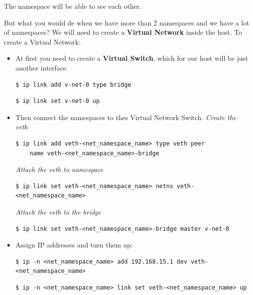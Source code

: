 \documentclass{article}
\newenvironment{codetemplate}[1][]{%
  \mybasecolorbox[#1]
  \itshape
}{%
  \endmybasecolorbox
}
\begin{document}
The namespace will be able to see each other.

But what you would de when we have more than 2 namespaces and we have a lot of namespaces? We will need to create a \textbf{Virtual Network} inside the host. To create a Virtual Network:
\begin{itemize}
    \item At first you need to create a \textbf{Virtual Switch}, which for our host will be just another interface.
\begin{codetemplate}{}
\begin{verbatim}
$ ip link add v-net-0 type bridge
\end{verbatim}
\end{codetemplate}
\begin{codetemplate}{}
\begin{verbatim}
$ ip link set v-net-0 up
\end{verbatim}
\end{codetemplate}
    \item Then connect the namespaces to thes Virtual Network Switch.
\begin{codetemplate}{Create the veth}
\begin{verbatim}
$ ip link add veth-<net_namespace_name> type veth peer 
    name veth-<net_namespace_name>-bridge
\end{verbatim}
\end{codetemplate}
\begin{codetemplate}{Attach the veth to namespace}
\begin{verbatim}
$ ip link set veth-<net_namespace_name> netns veth-<net_namespace_name>
\end{verbatim}
\end{codetemplate}
\begin{codetemplate}{Attach the veth to the bridge}
\begin{verbatim}
$ ip link set veth-<net_namespace_name>-bridge master v-net-0
\end{verbatim}
\end{codetemplate}
    \item Assign IP addresses and turn them up:
\begin{codetemplate}{}
\begin{verbatim}
$ ip -n <net_namespace_name> add 192.168.15.1 dev veth-<net_namespace_name>
\end{verbatim}
\end{codetemplate}
\begin{codetemplate}{}
\begin{verbatim}
$ ip -n <net_namespace_name> link set veth-<net_namespace_name> up
\end{verbatim}
\end{codetemplate}
\end{itemize}
\end{document}
